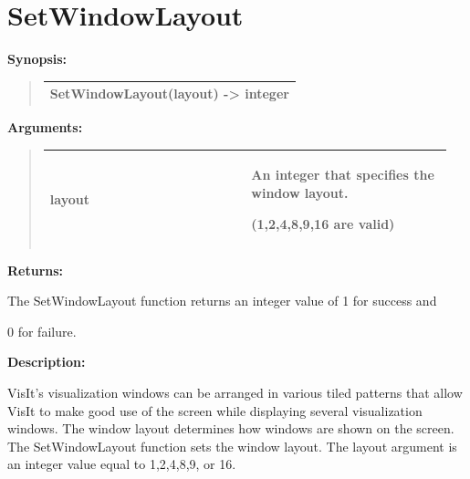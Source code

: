 \documentclass[letterpaper,10pt,english]{sphinxmanual}
\begin{document}
\section{SetWindowLayout}
\label{functions:setwindowlayout}
\begin{DUlineblock}{0em}
\item[] \textbf{Synopsis:}
\end{DUlineblock}
\begin{quote}

\begin{tabulary}{\linewidth}{|L|}
\hline

SetWindowLayout(layout) -\textgreater{} integer
\\
\hline\end{tabulary}

\end{quote}

\begin{DUlineblock}{0em}
\item[] 
\item[] \textbf{Arguments:}
\end{DUlineblock}
\begin{quote}

\begin{tabular}{|p{0.475\linewidth}|p{0.475\linewidth}|}
\hline

layout
 & 
\begin{DUlineblock}{0em}
\item[] An integer that specifies the window layout.
\item[] (1,2,4,8,9,16 are valid)
\end{DUlineblock}
\\
\hline\end{tabular}

\end{quote}

\begin{DUlineblock}{0em}
\item[] 
\item[] \textbf{Returns:}
\item[] The SetWindowLayout function returns an integer value of 1 for success and
\item[] 0 for failure.
\item[] 
\item[] \textbf{Description:}
\item[] VisIt's visualization windows can be arranged in various tiled patterns
that allow VisIt to make good use of the screen while displaying several
visualization windows. The window layout determines how windows are shown
on the screen. The SetWindowLayout function sets the window layout. The
layout argument is an integer value equal to 1,2,4,8,9, or 16.
\end{DUlineblock}
\end{document}
